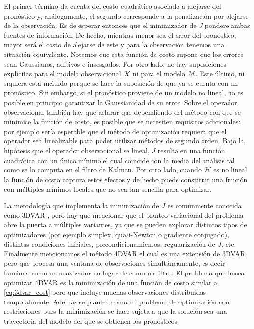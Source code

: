 El primer término da cuenta del costo cuadrático asociado a alejarse del pronóstico y, análogamente, el segundo corresponde a la penalización por alejarse de la observación. Es de esperar entonces que el minimizador de $J$ pondere ambas fuentes de información. De hecho, mientras menor sea el error del pronóstico, mayor será el costo de alejarse de este y para la observación tenemos una situación equivalente. Notemos que esta función de costo supone que los errores sean Gaussianos, aditivos e insesgados. Por otro lado, no hay suposiciones explícitas para el modelo observacional $\mathcal{H}$ ni para el modelo $\mathcal{M}$. Este último, ni siquiera está incluido porque se hace la suposición de que ya se cuenta con un pronóstico. Sin embargo, si el pronóstico proviene de un modelo no lineal, no es posible en principio garantizar la Gaussianidad de su error. Sobre el operador observacional también hay que aclarar que dependiendo del método con que se minimice la función de costo, es posible que se necesiten requisitos adicionales: por ejemplo sería esperable que el método de optimización requiera que el operador sea linealizable para poder utilizar métodos de segundo orden. Bajo la hipótesis que el operador observacional se lineal, $J$ resulta en una función cuadrática con un único mínimo el cual coincide con la media del análisis tal como se lo computa en el filtro de Kalman. Por otro lado, cuando $\mathcal{H}$ es no lineal la función de costo captura estos efectos y de hecho puede constituir una función con múltiples mínimos locales que no sea tan sencilla para optimizar.

La metodología que implementa la minimización de $J$ es comúnmente conocida como 3DVAR \citep{Courtier1998}, pero hay que mencionar que el planteo variacional del problema abre la puerta a múltiples variantes, ya que se pueden explorar distintos tipos de optimizadores (por ejemplo simplex, quasi-Newton o gradiente conjugado), distintas condiciones iniciales, precondicionamientos, regularización de $J$, etc. Finalmente mencionamos el método 4DVAR \citep{Talagrand1987, Rabier2003} el cual es una extensión de 3DVAR pero que procesa una ventana de observaciones simultáneamente, es decir funciona como un suavizador en lugar de como un filtro. El problema que busca optimizar 4DVAR es la minimización de una función de costo similar a \ref{eq:3dvar_cost} pero que incluye muchas observaciones distribuidas temporalmente. Además se plantea como un problema de optimización con restricciones pues la minimización se hace sujeta a que la solución sea una trayectoria del modelo del que se obtienen los pronósticos.

